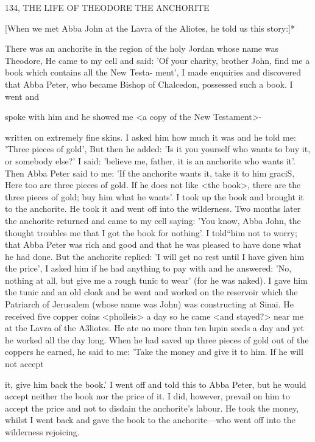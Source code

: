 134, THE LIFE OF THEODORE THE ANCHORITE

[When we met Abba John at the Lavra of the Aliotes, he told us
this story:]*

There was an anchorite in the region of the holy Jordan whose
name was Theodore, He came to my cell and said: 'Of your charity,
brother John, find me a book which contains all the New Testa-
ment', I made enquiries and discovered that Abba Peter, who
became Bishop of Chalcedon, possessed such a book. I went and

spoke with him and he showed me <a copy of the New Testament>-

written on extremely fine skins. I asked him how much it was and
he told me: 'Three pieces of gold', But then he added: 'Is it you
yourself who wants to buy it, or somebody else?' I said: 'believe me,
father, it is an anchorite who wants it'. Then Abba Peter said to me:
'If the anchorite wants it, take it to him graciS, Here too are three
pieces of gold. If he does not like <the book>, there are the three
pieces of gold; buy him what he wants'. I took up the book and
brought it to the anchorite. He took it and went off into the
wilderness. Two months later the anchorite returned and came to
my cell saying: 'You know, Abba John, the thought troubles me
that I got the book for nothing'. I told“him not to worry; that Abba
Peter was rich and good and that he was pleased to have done what
he had done. But the anchorite replied: 'I will get no rest until I
have given him the price', I asked him if he had anything to pay
with and he answered: 'No, nothing at all, but give me a rough
tunic to wear' (for he was naked). I gave him the tunic and an old
cloak and he went and worked on the reservoir which the Patriarch
of Jerusalem (whose name was John) was constructing at Sinai. He
received five copper coins <pholleis> a day so he came <and
stayed?> near me at the Lavra of the A3liotes. He ate no more than
ten lupin seeds a day and yet he worked all the day long. When he
had saved up three pieces of gold out of the coppers he earned, he
said to me: 'Take the money and give it to him. If he will not accept

it, give him back the book.' I went off and told this to Abba Peter,
but he would accept neither the book nor the price of it. I did,
however, prevail on him to accept the price and not to disdain the
anchorite's labour. He took the money, whilst I went back and gave
the book to the anchorite—who went off into the wilderness
rejoicing.

